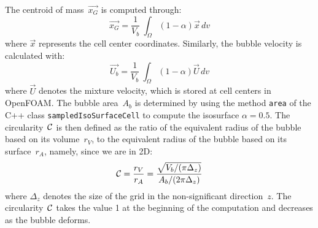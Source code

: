 \documentclass[review]{elsarticle}
\begin{document}
The centroid of mass~$\overrightarrow{x_G}$ is computed through: 
\begin{equation}
  \overrightarrow{x_G} = \frac{1}{V_b}~\int_{\Omega}(1-\alpha)\overrightarrow{x}\,dv
\end{equation}
where $\overrightarrow{x}$ represents the cell center coordinates. Similarly, the bubble velocity is calculated with:
\begin{equation}
  \overrightarrow{U_b} = \frac{1}{V_b}~\int_{\Omega}(1-\alpha)\overrightarrow{U}\,dv
  \label{eqnPPvelocity}
\end{equation}
where $\overrightarrow{U}$ denotes the mixture velocity, which is stored at cell centers in OpenFOAM. The bubble area~$A_b$ is determined by using the method \verb+area+ of the C++ class \verb+sampledIsoSurfaceCell+ to compute the isosurface $\alpha=0.5$. The circularity~$\cal{C}$ is then defined as the ratio of the equivalent radius of the bubble based on its volume~$r_V$, to the equivalent radius of the bubble based on its surface~$r_A$, namely, since we are in 2D: 
\begin{equation}
 {\cal{C}} = \frac{r_V}{r_A} = \frac{\sqrt{V_b/(\pi \Delta_z)}}{ A_b/(2 \pi \Delta_z)} 
\end{equation}
where $\Delta_z$ denotes the size of the grid in the non-significant direction~$z$. The circularity~$\cal{C}$ takes the value 1 at the beginning of the computation and decreases as the bubble deforms.
\end{document}
